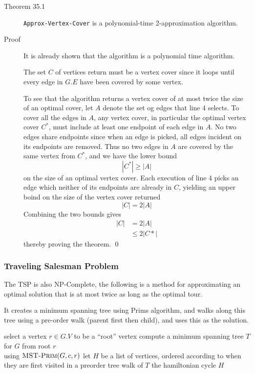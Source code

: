 
\begin{description}
\item[Theorem 35.1] \texttt{Approx-Vertex-Cover} is a polynomial-time
  2-approximation algorithm.
\item[Proof] It is already shown that the algorithm is a polynomial time
  algorithm.

  The set $C$ of vertices return must be a vertex cover since it loops until
  every edge in $G.E$ have been covered by some vertex.

  To see that the algorithm returns a vertex cover of at most twice the size of
  an optimal cover, let $A$ denote the set og edges that line 4 selects.  To
  cover all the edges in $A$, any vertex cover, in particular the optimal vertex
  cover $C^*$, must include at least one endpoint of each edge in $A$. No two
  edges share endpoints since when an edge is picked, all edges incident on its
  endpoints are removed. Thus no two edges in $A$ are covered by the same vertex
  from $C^*$, and we have the lower bound
  \[
    |C^*| \geq |A|
  \]
  on the size of an optimal vertex cover. Each execution of line 4 picks an edge
  which neither of its endpoints are already in $C$, yielding an upper boind on
  the size of the vertex cover returned
  \[
    |C| = 2|A|
  \]
  Combining the two bounds gives
  \begin{align*}
    |C| &= 2|A| \\
        &\leq 2|C*|
  \end{align*}
  thereby proving the theorem. \qed
\end{description}


\subsubsection{Traveling Salesman Problem}
The TSP is also NP-Complete, the following is a method for approximating an
optimal solution that is at most twice as long as the optimal tour.

It creates a minimum spanning tree using Prims algorithm, and walks along this
tree using a pre-order walk (parent first then child), and uses this as the
solution.

\begin{codebox}
\li select a vertex $r \in G.V$ to be a ``root'' vertex
\li compute a minimum spanning tree $T$ for $G$ from root $r$ \\
    using $\textnormal{\scshape MST-Prim}(G,c,r)$
\li let $H$ be a list of vertices, ordered according to when\\
    they are first visited in a preorder tree walk of $T$
\li \Return the hamiltonian cycle $H$
\end{codebox}

